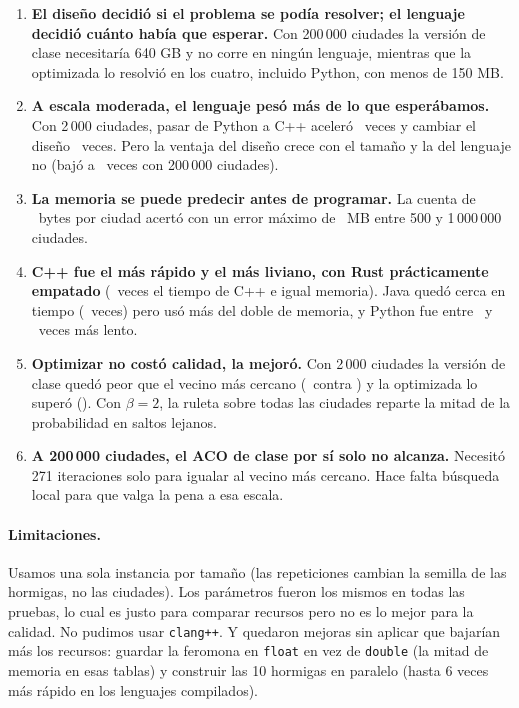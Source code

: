 \documentclass[11pt,a4paper]{article}
\begin{document}
\begin{enumerate}[itemsep=3pt]
\item \textbf{El diseño decidió si el problema se podía resolver; el lenguaje decidió cuánto
  había que esperar.} Con 200\,000 ciudades la versión de clase necesitaría 640 GB y
  no corre en ningún lenguaje, mientras que la optimizada lo resolvió en los cuatro,
  incluido Python, con menos de 150 MB.
\item \textbf{A escala moderada, el lenguaje pesó más de lo que esperábamos.} Con 2\,000
  ciudades, pasar de Python a C++ aceleró \RatioLenguajeNormal\ veces y cambiar el diseño
  \RatioDisenoCpp\ veces. Pero la ventaja del diseño crece con el tamaño y la del lenguaje
  no (bajó a \RatioLenguajeDoscientosMil\ veces con 200\,000 ciudades).
\item \textbf{La memoria se puede predecir antes de programar.} La cuenta de
  \BytesPorCiudad\ bytes por ciudad acertó con un error máximo de \ErrMaxPredMem\ MB entre
  500 y 1\,000\,000 ciudades.
\item \textbf{C++ fue el más rápido y el más liviano, con Rust prácticamente empatado}
  (\RelRustDoscientosMil\ veces el tiempo de C++ e igual memoria). Java quedó cerca en tiempo
  (\RelJavaDoscientosMil\ veces) pero usó más del doble de memoria, y Python fue entre
  \RatioLenguajeDoscientosMil\ y \RatioLenguajeOpt\ veces más lento.
\item \textbf{Optimizar no costó calidad, la mejoró.} Con 2\,000 ciudades la versión de
  clase quedó peor que el vecino más cercano (\BestNormalDosMil\ contra \LnnDosMil) y la
  optimizada lo superó (\BestOptDosMil). Con $\beta=2$, la ruleta sobre todas las
  ciudades reparte la mitad de la probabilidad en saltos lejanos.
\item \textbf{A 200\,000 ciudades, el ACO de clase por sí solo no alcanza.} Necesitó 271
  iteraciones solo para igualar al vecino más cercano. Hace falta búsqueda local para
  que valga la pena a esa escala.
\end{enumerate}

\paragraph{Limitaciones.} Usamos una sola instancia por tamaño (las repeticiones cambian
la semilla de las hormigas, no las ciudades). Los parámetros fueron los mismos en todas
las pruebas, lo cual es justo para comparar recursos pero no es lo mejor para la
calidad. No pudimos usar \texttt{clang++}. Y quedaron mejoras sin aplicar que
bajarían más los recursos: guardar la feromona en \texttt{float} en vez de
\texttt{double} (la mitad de memoria en esas tablas) y construir las 10 hormigas en
paralelo (hasta 6 veces más rápido en los lenguajes compilados).
\end{document}
